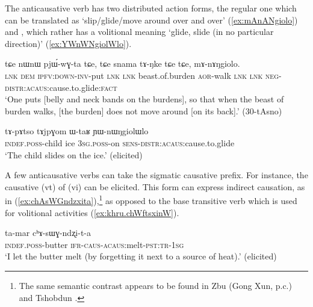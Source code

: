 The anticausative verb  has two distributed action forms, the regular one  which can be translated as `slip/glide/move around over and over' (\ref{ex:mAnANgiolo}) and , which rather has a volitional meaning `glide, slide (in no particular direction)' (\ref{ex:YWnWNgiolWlo}).
 
\begin{exe}
\ex \label{ex:mAnANgiolo}
\gll tɕe nɯnɯ pjɯ́-wɣ-ta tɕe, tɕe snama tɤ-ŋke tɕe tɕe, mɤ-nɤŋgiolo.  \\
\textsc{lnk} \textsc{dem} \textsc{ipfv}:\textsc{down}-\textsc{inv}-put \textsc{lnk} \textsc{lnk} beast.of.burden \textsc{aor}-walk \textsc{lnk} \textsc{lnk} \textsc{neg}-\textsc{distr}:\textsc{acaus}:cause.to.glide:\textsc{fact} \\
\glt `One puts [belly and neck bands on the burdens], so that when the beast of burden walks, [the burden] does not move around [on its back].' (30-tAsno)
 \end{exe}
 
\begin{exe}
\ex \label{ex:YWnWNgiolWlo}
\gll tɤ-pɤtso tɤjpɣom ɯ-taʁ ɲɯ-nɯŋgiolɯlo \\
\textsc{indef}.\textsc{poss}-child ice \textsc{3sg}.\textsc{poss}-on \textsc{sens}-\textsc{distr}:\textsc{acaus}:cause.to.glide \\
\glt `The child slides on the ice.' (elicited)
\end{exe}

A few anticausative verbs can take the sigmatic causative prefix. For instance, the causative  (vt) of  (vi) can be elicited. This form can express indirect causation, as in (\ref{ex:chAsWGndzxita}),\footnote{The same semantic contrast appears to be found in Zbu (Gong Xun, p.c.) and Tshobdun \citep{jackson14morpho}. } as opposed to the base transitive verb  which is used for volitional activities (\ref{ex:khru.chWftsxinW}).

\begin{exe}
\ex \label{ex:chAsWGndzxita}
\gll ta-mar cʰɤ-sɯɣ-ndʐi-t-a \\
\textsc{indef}.\textsc{poss}-butter \textsc{ifr}-\textsc{caus}-\textsc{acaus}:melt-\textsc{pst}:\textsc{tr}-\textsc{1sg} \\
\glt `I let the butter melt (by forgetting it next to a source of heat).' (elicited)
\end{exe}

